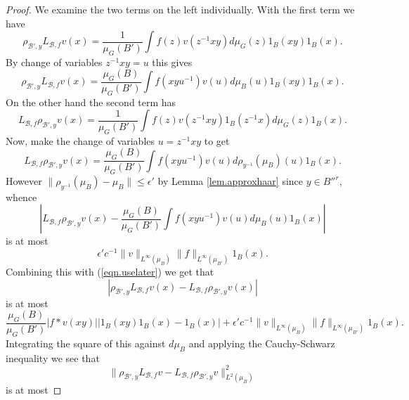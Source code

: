 \documentclass[12pt]{amsart}
\numberwithin{equation}{section}
\theoremstyle{plain}
\theoremstyle{definition}
\renewcommand{\leq}{\leqslant}
\begin{document}
\begin{proof}
We examine the two terms on the left individually.  With the first term we have
\begin{equation*}
\rho_{\mathcal{B}',y}L_{\mathcal{B},f}v(x)= \frac{1}{\mu_G(B')}\int{f(z)v(z^{-1}xy)d\mu_G(z)}1_B(xy)1_B(x).
\end{equation*}
By change of variables $z^{-1}xy = u$ this gives
\begin{equation}\label{eqn.uselater}
\rho_{\mathcal{B}',y}L_{\mathcal{B},f}v(x)= \frac{\mu_G(B)}{\mu_G(B')}\int{f(xyu^{-1})v(u)d\mu_B(u)}1_B(xy)1_B(x).
\end{equation}
On the other hand the second term has 
\begin{equation*}
L_{\mathcal{B},f}\rho_{\mathcal{B}',y}v(x)=\frac{1}{\mu_G(B')} \int{f(z)v(z^{-1}xy)1_{B}(z^{-1}x)d\mu_G(z)}1_B(x).
\end{equation*}
Now, make the change of variables $u=z^{-1}xy$ to get
\begin{equation*}
L_{\mathcal{B},f}\rho_{\mathcal{B}',y}v(x)=\frac{\mu_G(B)}{\mu_G(B')} \int{f(xyu^{-1})v(u)d\rho_{y^{-1}}(\mu_{B})(u)}1_B(x).
\end{equation*}
However $\|\rho_{y^{-1}}(\mu_{B}) - \mu_B\| \leq \epsilon'$ by Lemma \ref{lem.approxhaar} since $y \in B''^r$, whence
\begin{equation*}
|L_{\mathcal{B},f}\rho_{\mathcal{B}',y}v(x) - \frac{\mu_G(B)}{\mu_G(B')} \int{f(xyu^{-1})v(u)d\mu_{B}(u)}1_B(x)|
\end{equation*}
is at most
\begin{equation*}
\epsilon'c^{-1} \|v\|_{L^\infty(\mu_B)}\|f\|_{L^\infty(\mu_{B'})}1_B(x).
\end{equation*}
Combining this with (\ref{eqn.uselater}) we get that
\begin{equation*}
|\rho_{\mathcal{B}',y}L_{\mathcal{B},f}v(x) - L_{\mathcal{B},f}\rho_{\mathcal{B}',y}v(x)|
\end{equation*}
is at most
\begin{equation*}
\frac{\mu_G(B)}{\mu_G(B')}|f \ast v(xy)||1_B(xy)1_B(x)-1_B(x)| + \epsilon'c^{-1} \|v\|_{L^\infty(\mu_B)}\|f\|_{L^\infty(\mu_{B'})}1_B(x).
\end{equation*}
Integrating the square of this against $d\mu_B$ and applying the Cauchy-Schwarz inequality we see that
\begin{equation*}
\|\rho_{\mathcal{B}',y}L_{\mathcal{B},f}v - L_{\mathcal{B},f}\rho_{\mathcal{B}',y}v\|_{L^2(\mu_B)}^2
\end{equation*}
is at most

\end{proof}
\end{document}
